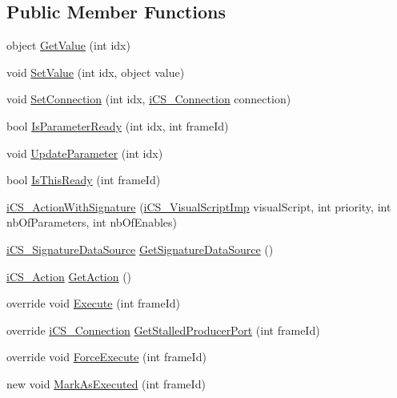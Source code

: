 \subsection*{Public Member Functions}
\begin{DoxyCompactItemize}
\item 
object \hyperlink{classi_c_s___action_with_signature_a880c40a7807ba2bb817869e6d3b0903d}{Get\+Value} (int idx)
\item 
void \hyperlink{classi_c_s___action_with_signature_a318a39d44f4475116ec332324cc68791}{Set\+Value} (int idx, object value)
\item 
void \hyperlink{classi_c_s___action_with_signature_a980baf20437e0343b20e3d7db68c3088}{Set\+Connection} (int idx, \hyperlink{classi_c_s___connection}{i\+C\+S\+\_\+\+Connection} connection)
\item 
bool \hyperlink{classi_c_s___action_with_signature_a97df299dd76e41ba870eb910e9476eac}{Is\+Parameter\+Ready} (int idx, int frame\+Id)
\item 
void \hyperlink{classi_c_s___action_with_signature_a25c4c5a4ee09fccf22c6b46dc25edd0b}{Update\+Parameter} (int idx)
\item 
bool \hyperlink{classi_c_s___action_with_signature_aed9984062628ad8657e68f359996b3b5}{Is\+This\+Ready} (int frame\+Id)
\item 
\hyperlink{classi_c_s___action_with_signature_a3d7c8a4ccb91795db47a3aeedd640ce0}{i\+C\+S\+\_\+\+Action\+With\+Signature} (\hyperlink{classi_c_s___visual_script_imp}{i\+C\+S\+\_\+\+Visual\+Script\+Imp} visual\+Script, int priority, int nb\+Of\+Parameters, int nb\+Of\+Enables)
\item 
\hyperlink{classi_c_s___signature_data_source}{i\+C\+S\+\_\+\+Signature\+Data\+Source} \hyperlink{classi_c_s___action_with_signature_ada39994e0aa41c0f2dae8fc77b2d1758}{Get\+Signature\+Data\+Source} ()
\item 
\hyperlink{classi_c_s___action}{i\+C\+S\+\_\+\+Action} \hyperlink{classi_c_s___action_with_signature_ae42c4e635dedf36c3cc7270cac418f14}{Get\+Action} ()
\item 
override void \hyperlink{classi_c_s___action_with_signature_a6e430c98e719f070543a70513250d11a}{Execute} (int frame\+Id)
\item 
override \hyperlink{classi_c_s___connection}{i\+C\+S\+\_\+\+Connection} \hyperlink{classi_c_s___action_with_signature_a44d2ee22f6534add466a362c7dfbaf85}{Get\+Stalled\+Producer\+Port} (int frame\+Id)
\item 
override void \hyperlink{classi_c_s___action_with_signature_ab358c6b7de930dd5a0f6a9a0d7d85234}{Force\+Execute} (int frame\+Id)
\item 
new void \hyperlink{classi_c_s___action_with_signature_aef5e1def1a96ef21f4aebeaa45ba7b32}{Mark\+As\+Executed} (int frame\+Id)
\end{DoxyCompactItemize}
